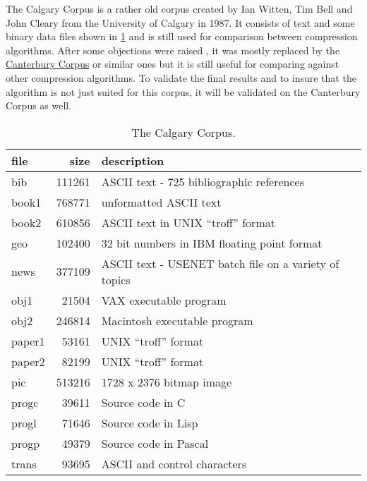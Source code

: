 \par{
The Calgary Corpus \cite{calgaryCorpus} is a rather old corpus created by Ian Witten, Tim Bell and John Cleary from the University of Calgary in 1987. It consists of text and some binary data files shown in \ref{tab:t05 The Calgary Corpus} and is still used for comparison between compression algorithms. After some objections were raised \cite{CalgaryCorpusCritic}, it was mostly replaced by the \href{http://corpus.canterbury.ac.nz/}{Canterbury Corpus} or similar ones but it is still useful for comparing against other compression algorithms. To validate the final results and to insure that the algorithm is not just suited for this corpus, it will be validated on the Canterbury Corpus as well.

\begin{table}[H]
	\centering
	\begin{tabular}{l|r|l}	
		file & size & description\\
		\hline
bib & 111261 & ASCII text - 725 bibliographic references\\
book1 & 768771 & unformatted ASCII text\\
book2 & 610856 & ASCII text in UNIX \enquote{troff} format\\
geo & 102400 & 32 bit numbers in IBM floating point format\\
news & 377109 & ASCII text - USENET batch file on a variety of topics\\
obj1 & 21504 & VAX executable program \\
obj2 & 246814 &	Macintosh executable program \\
paper1 & 53161 & UNIX \enquote{troff} format \\
paper2 & 82199 & UNIX \enquote{troff} format \\
pic & 513216 & 1728 x 2376 bitmap image\\
progc & 39611 & Source code in C \\
progl & 71646 &  Source code in Lisp\\
progp & 49379 & Source code in Pascal\\
trans & 93695 & ASCII and control characters\\	 
	\end{tabular}
	\caption{The Calgary Corpus.}
	\label{tab:t05 The Calgary Corpus}
\end{table}	
}

